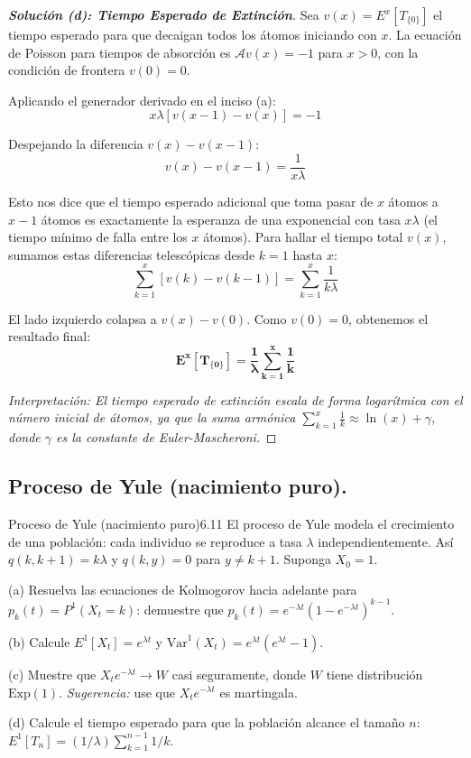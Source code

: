 \documentclass[10pt,a4paper]{article}
\begin{document}
\begin{proof}[\textbf{Solución (d): Tiempo Esperado de Extinción}]
    Sea $v(x) = E^x[T_{\{0\}}]$ el tiempo esperado para que decaigan todos los átomos iniciando con $x$.
    La ecuación de Poisson para tiempos de absorción es $\mathcal{A}v(x) = -1$ para $x > 0$, con la condición de frontera $v(0) = 0$.
    
    Aplicando el generador derivado en el inciso (a):
    \[ x\lambda [v(x-1) - v(x)] = -1 \]
    
    Despejando la diferencia $v(x) - v(x-1)$:
    \[ v(x) - v(x-1) = \frac{1}{x\lambda} \]
    
    Esto nos dice que el tiempo esperado adicional que toma pasar de $x$ átomos a $x-1$ átomos es exactamente la esperanza de una exponencial con tasa $x\lambda$ (el tiempo mínimo de falla entre los $x$ átomos).
    Para hallar el tiempo total $v(x)$, sumamos estas diferencias telescópicas desde $k=1$ hasta $x$:
    \[ \sum_{k=1}^x [v(k) - v(k-1)] = \sum_{k=1}^x \frac{1}{k\lambda} \]
    
    El lado izquierdo colapsa a $v(x) - v(0)$. Como $v(0) = 0$, obtenemos el resultado final:
    \[ \mathbf{E^x[T_{\{0\}}] = \frac{1}{\lambda} \sum_{k=1}^x \frac{1}{k}} \]
    
    \textit{Interpretación: El tiempo esperado de extinción escala de forma logarítmica con el número inicial de átomos, ya que la suma armónica $\sum_{k=1}^x \frac{1}{k} \approx \ln(x) + \gamma$, donde $\gamma$ es la constante de Euler-Mascheroni.}
\end{proof}


\newpage

\subsection{Proceso de Yule (nacimiento puro).}

\vspace{5mm}

\begin{ejercicio}{Proceso de Yule (nacimiento puro)}{6.11}
    El proceso de Yule modela el crecimiento de una población: cada individuo se reproduce a tasa $\lambda$ independientemente. Así $q(k, k + 1) = k\lambda$ y $q(k, y) = 0$ para $y \neq k + 1$. Suponga $X_0 = 1$.
    
    (a) Resuelva las ecuaciones de Kolmogorov hacia adelante para $p_k(t) = P^1(X_t = k)$: demuestre que $p_k(t) = e^{-\lambda t}(1 - e^{-\lambda t})^{k-1}$.
    
    (b) Calcule $E^1[X_t] = e^{\lambda t}$ y $\text{Var}^1(X_t) = e^{\lambda t}(e^{\lambda t} - 1)$.
    
    (c) Muestre que $X_t e^{-\lambda t} \to W$ casi seguramente, donde $W$ tiene distribución $\text{Exp}(1)$. \textit{Sugerencia:} use que $X_t e^{-\lambda t}$ es martingala.
    
    (d) Calcule el tiempo esperado para que la población alcance el tamaño $n$: $E^1[T_n] = (1/\lambda) \sum_{k=1}^{n-1} 1/k$.
\end{ejercicio}
\end{document}
